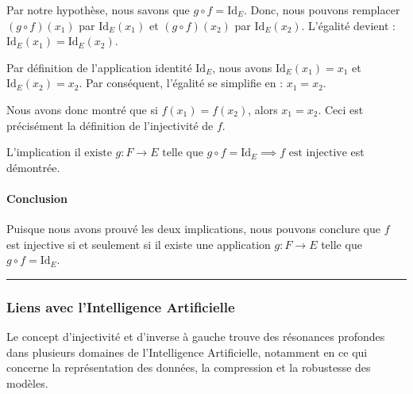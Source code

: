 \documentclass[12pt,a4paper]{report}
\begin{document}
Par notre hypothèse, nous savons que \(g \circ f = \text{Id}_E\). Donc,
nous pouvons remplacer \((g \circ f)(x_1)\) par \(\text{Id}_E(x_1)\) et
\((g \circ f)(x_2)\) par \(\text{Id}_E(x_2)\). L'égalité devient :
\(\text{Id}_E(x_1) = \text{Id}_E(x_2)\).

Par définition de l'application identité \(\text{Id}_E\), nous avons
\(\text{Id}_E(x_1) = x_1\) et \(\text{Id}_E(x_2) = x_2\). Par
conséquent, l'égalité se simplifie en : \(x_1 = x_2\).

Nous avons donc montré que si \(f(x_1) = f(x_2)\), alors \(x_1 = x_2\).
Ceci est précisément la définition de l'injectivité de \(f\).

L'implication
\(\text{il existe } g: F \to E \text{ telle que } g \circ f = \text{Id}_E \implies f \text{ est injective}\)
est démontrée.

\paragraph{Conclusion}\label{conclusion}

Puisque nous avons prouvé les deux implications, nous pouvons conclure
que \(f\) est injective si et seulement si il existe une application
\(g: F \to E\) telle que \(g \circ f = \text{Id}_E\).

\begin{center}\rule{0.5\linewidth}{0.5pt}\end{center}

\subsubsection{Liens avec l'Intelligence
Artificielle}\label{liens-avec-lintelligence-artificielle}

Le concept d'injectivité et d'inverse à gauche trouve des résonances
profondes dans plusieurs domaines de l'Intelligence Artificielle,
notamment en ce qui concerne la représentation des données, la
compression et la robustesse des modèles.
\end{document}
